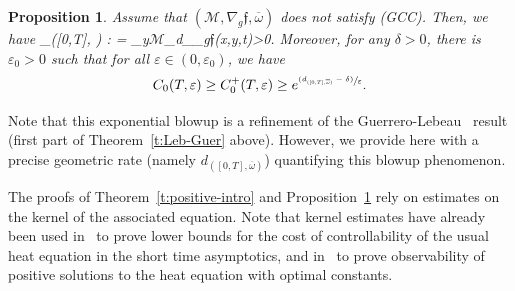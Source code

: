 \documentclass[JEP,XML,SOM,Unicode]{cedram}
\newcommand{\pGCC}{\textup{(GCC)}\xspace}
\newcommand{\psfrac}[2]{\sfrac{(#1)}{#2}}
\newtheorem{proposition}[lemma]{Proposition}
\theoremstyle{definition}
\newcommand{\M}{\ensuremath{\mathcal M}}
\newcommand{\f}{\ensuremath{\mathfrak{f}}}
\def\bal#1\nal{\begin{align*}#1\end{align*}}
\let\e\varepsilon
\let\eps\varepsilon
\begin{document}
\begin{proposition}
\label{proplowerobse+}
Assume that $(\M,\nabla_g \f,\overline{\omega})$ does not satisfy \pGCC. Then, we have
\bal
d_{([0,T], \overline{\omega})} : = \sup_{y\in \M}\inf_{}d_{\nabla_g\f}(x,y,t)>0.
\nal
Moreover, for any $\delta>0$, there is $\e_0>0$ such that for all $\eps \in (0,\eps_0)$, we have
\begin{equation}
C_{0}(T,\e)\geq C_{0}^{+}(T,\e)\geq e^{\psfrac{d_{([0,T], \overline{\omega})}-\delta}{\e}}\label{lowercost+}.
\end{equation}
\end{proposition}
Note that this exponential blowup is a refinement of the Guerrero-Lebeau~\cite{GL:07} result (first part of Theorem~\ref{t:Leb-Guer} above). However, we provide here with a precise geometric rate (namely $d_{([0,T], \overline{\omega})}$) quantifying this blowup phenomenon.

The proofs of Theorem~\ref{t:positive-intro} and Proposition~\ref{proplowerobse+} rely on estimates on the kernel of the associated equation. Note that kernel estimates have already been used in~\cite{Miller:04} to prove lower bounds for the cost of controllability of the usual heat equation in the short time asymptotics, and in~\cite{LL:18} to prove observability of positive solutions to the heat equation with optimal constants.
\end{document}
